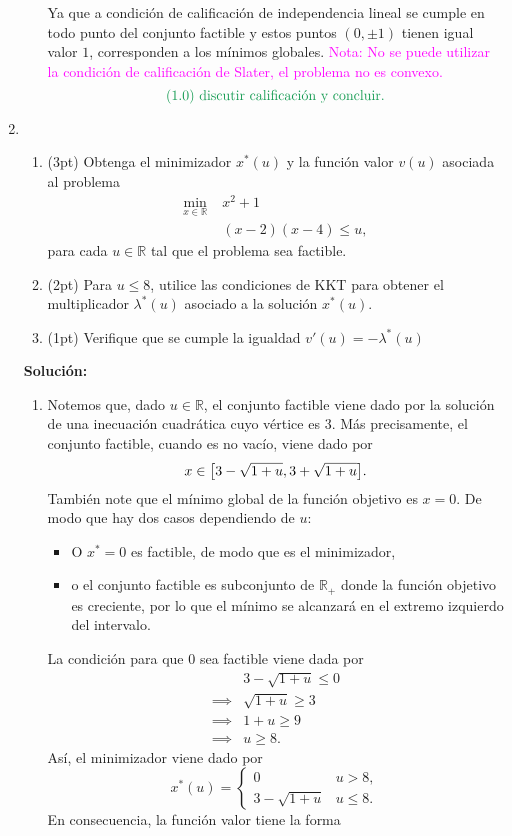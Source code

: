 \documentclass{article}
\begin{document}
\begin{enumerate}
\begin{enumerate}
		Ya que a condición de calificación de independencia lineal se cumple en todo punto del conjunto factible y estos puntos \((0, \pm 1)\) tienen igual valor \(1\), corresponden a los mínimos globales. \textcolor{magenta}{Nota: No se puede utilizar la condición de calificación de Slater, el problema no es convexo.}
		\[
			\text{\textcolor{ForestGreen}{(1.0) discutir calificación y concluir.}}
		\]
		\end{enumerate}
	\item 
		\begin{enumerate}
			\item (3pt) Obtenga el minimizador \(x^*(u)\) y la función valor \(v(u)\) asociada al problema
				\begin{align*}
					\min_{x \in \mathbb{R}}\; & x^2 + 1 \\
								  & (x - 2)(x - 4) \leq u,
				\end{align*}
				para cada \(u \in \mathbb{R}\) tal que el problema sea factible.
			\item (2pt) Para \(u \leq 8\), utilice las condiciones de KKT para obtener el multiplicador \(\lambda^*(u)\) asociado a la solución \(x^*(u)\).
			\item (1pt) Verifique que se cumple la igualdad \(v'(u) = -\lambda^*(u)\)
		\end{enumerate}

		\textbf{Solución:}
		\begin{enumerate}
			\item Notemos que, dado \(u \in \mathbb{R}\), el conjunto factible viene dado por la solución de una inecuación cuadrática cuyo vértice es \(3\). Más precisamente, el conjunto factible, cuando es no vacío, viene dado por
				\[
					x \in \qty[3 - \sqrt{1 + u}, 3 + \sqrt{1 + u}].
				\]
				También note que el mínimo global de la función objetivo es \(x = 0\). De modo que hay dos casos dependiendo de \(u\):
				\begin{itemize}
					\item O \(x^* = 0\) es factible, de modo que es el minimizador,
					\item o el conjunto factible es subconjunto de \(\mathbb{R}_+\) donde la función objetivo es creciente, por lo que el mínimo se alcanzará en el extremo izquierdo del intervalo.
				\end{itemize}
				La condición para que \(0\) sea factible viene dada por
				\begin{align*}
					& 3 - \sqrt{1 + u} \leq 0 \\
					\implies & \sqrt{1 + u} \geq 3 \\
					\implies & 1 + u \geq 9 \\
					\implies & u \geq 8.
				\end{align*}
				Así, el minimizador viene dado por
				\[
					x^*(u) = \begin{cases}
						0 & u > 8, \\
						3 - \sqrt{1+u} & u \leq 8.
					\end{cases}
				\]
				En consecuencia, la función valor tiene la forma
		\end{enumerate}
\end{enumerate}
\end{document}
